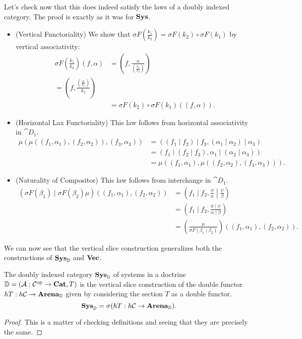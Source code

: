 \documentclass[DynamicalBook]{subfiles}
\begin{document}
Let's check now that this does indeed satisfy the laws of a doubly indexed
category. The proof is exactly as it was for $\textbf{Sys}$. 
\begin{itemize}
  \item (Vertical Functoriality) We show that $\sigma F\left(
      \frac{k_1}{k_2} \right) =
    \sigma F(k_2) \circ \sigma F (k_1)$ by
    vertical associativity:
\begin{align*}
  \sigma F\left(\frac{k_1}{k_2}\right)(f, \alpha) &= \left(f,  \frac{\alpha}{\left( \frac{k_1}{k_2} \right)} \right) \\
= \left(f, \frac{\left( \frac{\alpha}{k_1} \right)}{k_2}   \right)\\
&= \sigma F(k_2) \circ \sigma F (k_1)((f, \alpha)).
\end{align*}

\item (Horizontal Lax Functoriality) This law follows from horizontal
  associativity in $\cat{D}_1$.
\begin{align*}
  \mu(\mu((f_1, \alpha_1), (f_2, \alpha_2)), (f_3, \alpha_3)) &= ((f_1 \mid f_2) \mid f_3, (\alpha_1 \mid \alpha_2) \mid \alpha_3) \\
&= (f_1 \mid (f_2 \mid f_3), \alpha_1 \mid (\alpha_2 \mid \alpha_3)) \\
&= \mu((f_1, \alpha_1), \mu((f_2, \alpha_2), (f_3, \alpha_3))).
\end{align*}
\item (Naturality of Compositor) This law follows from interchange in
  $\cat{D}_1$.
\begin{align*}
  \left( \sigma F(\beta_1) \mid \sigma F(\beta_2){\mu} \right)((f_1, \alpha_1), (f_2, \alpha_2)) &= \left(f_1 \mid f_2,   \left. \frac{\phi}{\alpha} \middle| \frac{\psi}{\beta} \right.\right) \\
&= \left(f_1 \mid f_2,  \frac{\phi \mid \psi}{\alpha \mid \beta}\right) \\
&= \left(  \frac{\mu}{\sigma F(\beta_1 \mid \beta_2)}\right)((f_1,\alpha_1),(f_2,\alpha_2)).
\end{align*}
\end{itemize}

We can now see that the vertical slice construction generalizes both the
constructions of $\textbf{Sys}_{\mathbb{D}}$ and $\textbf{Vec}$. 
\begin{proposition}\label{prop.sys_is_vertical_slice}
  The doubly indexed category $\textbf{Sys}_{\mathbb{D}}$ of systems in a doctrine
  $\mathbb{D} = (\mathcal{A} : \mathcal{C}^{\textnormal{op}} \to \textbf{Cat}, T)$ is the vertical slice
  construction of the double functor $hT : h\mathcal{C} \to
  \textbf{Arena}_{\mathbb{D}}$ given by considering the section $T$ as a double
  functor.
$$\textbf{Sys}_{\mathbb{D}} = \sigma (hT : h\mathcal{C} \to \textbf{Arena}_{\mathbb{D}}).$$
\end{proposition}
\begin{proof}
This is a matter of checking definitions and seeing that they are precisely the same.
\end{proof}
\end{document}

